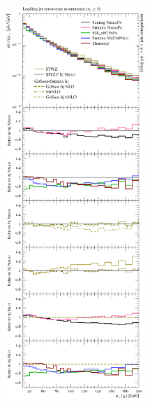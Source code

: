 \begin{figure}[t!]
  \centering
  \includegraphics[width=0.47\textwidth]{figures/hjetscomp_u_jet1_pT_incl.pdf}
  \hfill

\end{figure}
